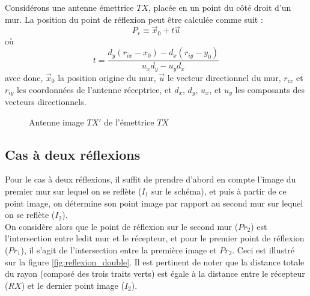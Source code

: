 Consid{\'e}rons une antenne {\'e}mettrice $TX$, plac{\'e}e en un point du
c{\^o}t{\'e} droit d'un mur. La position du point de réflexion peut être calculée comme suit :
\[ P_r \equiv \vec{x}_0 + t \vec{u} \]
o{\`u}
\[ t = \frac{d_y  (r_{ix} - x_0) - d_x  (r_{iy} - y_0)}{u_x d_y - u_y d_x} \]
avec donc, $\vec{x}_0$ la position origine du mur, $\vec{u}$ le vecteur directionnel
du mur, $r_{ix}$ et $r_{iy}$ les coordonn{\'e}es de l'antenne
r{\'e}ceptrice, et $d_x$, $d_y$, $u_x$, et $u_y$ les composants des
vecteurs directionnels.


\begin{figure}[H]
    \centering
    \caption{Antenne image $TX'$ de l'émettrice $TX$}
    \label{fig:antenne_image}
\end{figure}
\subsection{Cas à deux réflexions}
Pour le cas à deux réflexions, il suffit de prendre d'abord en compte l'image du premier mur sur lequel on se reflète ($I_1$ sur le schéma), et puis à partir de ce point image, on détermine son point image par rapport au second mur sur lequel on se reflète ($I_2$). 
\\ On considère alors que le point de réflexion sur le second mur ($Pr_2$) est l'intersection entre ledit mur et le récepteur, et pour le premier point de réflexion ($Pr_{1}$), il s'agit de l'intersection entre la première image et $Pr_{2}$. 
Ceci est illustré sur la figure  \ref{fig:reflexion_double}. Il est pertinent de noter que la distance totale du rayon (composé des trois traits verts) est égale à la distance entre le récepteur ($RX$) et le dernier point image ($I_2$).

